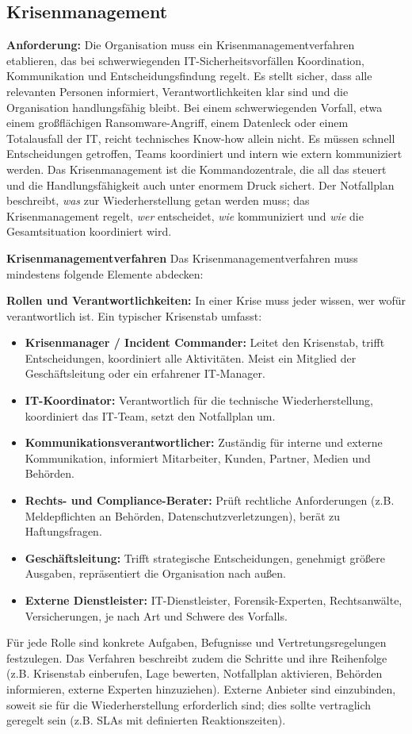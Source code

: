 \newpage
\subsection{Krisenmanagement}
\textbf{Anforderung:} Die Organisation muss ein Krisenmanagementverfahren etablieren, das bei schwerwiegenden IT-Sicherheitsvorfällen Koordination, Kommunikation und Entscheidungsfindung regelt. Es stellt sicher, dass alle relevanten Personen informiert, Verantwortlichkeiten klar sind und die Organisation handlungsfähig bleibt.
Bei einem schwerwiegenden Vorfall, etwa einem großflächigen Ransomware-Angriff, einem Datenleck oder einem Totalausfall der IT, reicht technisches Know-how allein nicht. Es müssen schnell Entscheidungen getroffen, Teams koordiniert und intern wie extern kommuniziert werden. Das Krisenmanagement ist die Kommandozentrale, die all das steuert und die Handlungsfähigkeit auch unter enormem Druck sichert.
Der Notfallplan beschreibt, \textit{was} zur Wiederherstellung getan werden muss; das Krisenmanagement regelt, \textit{wer} entscheidet, \textit{wie} kommuniziert und \textit{wie} die Gesamtsituation koordiniert wird.

\textbf{Krisenmanagementverfahren}
Das Krisenmanagementverfahren muss mindestens folgende Elemente abdecken:

\textbf{Rollen und Verantwortlichkeiten:} In einer Krise muss jeder wissen, wer wofür verantwortlich ist. Ein typischer Krisenstab umfasst:
\begin{itemize}
    \item \textbf{Krisenmanager / Incident Commander:} Leitet den Krisenstab, trifft Entscheidungen, koordiniert alle Aktivitäten. Meist ein Mitglied der Geschäftsleitung oder ein erfahrener IT-Manager.
    \item \textbf{IT-Koordinator:} Verantwortlich für die technische Wiederherstellung, koordiniert das IT-Team, setzt den Notfallplan um.
    \item \textbf{Kommunikationsverantwortlicher:} Zuständig für interne und externe Kommunikation, informiert Mitarbeiter, Kunden, Partner, Medien und Behörden.
    \item \textbf{Rechts- und Compliance-Berater:} Prüft rechtliche Anforderungen (z.B. Meldepflichten an Behörden, Datenschutzverletzungen), berät zu Haftungsfragen.
    \item \textbf{Geschäftsleitung:} Trifft strategische Entscheidungen, genehmigt größere Ausgaben, repräsentiert die Organisation nach außen.
    \item \textbf{Externe Dienstleister:} IT-Dienstleister, Forensik-Experten, Rechtsanwälte, Versicherungen, je nach Art und Schwere des Vorfalls.
\end{itemize}
\newpage
Für jede Rolle sind konkrete Aufgaben, Befugnisse und Vertretungsregelungen festzulegen. Das Verfahren beschreibt zudem die Schritte und ihre Reihenfolge (z.B. Krisenstab einberufen, Lage bewerten, Notfallplan aktivieren, Behörden informieren, externe Experten hinzuziehen).
Externe Anbieter sind einzubinden, soweit sie für die Wiederherstellung erforderlich sind; dies sollte vertraglich geregelt sein (z.B. SLAs mit definierten Reaktionszeiten).


